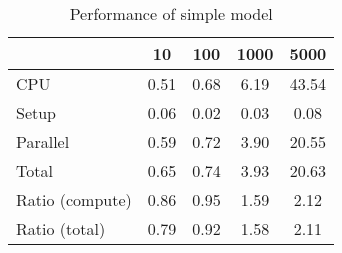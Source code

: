 \begin{table}[!h]
\centering
\caption{Performance of simple model}
\begin{tabular}{l*{4}{c}}\hline
& 10 &             100 &            1000 &            5000 \\ \hline
CPU &     0.51 &      0.68 &      6.19 &     43.54 \\
Setup &     0.06 &      0.02 &      0.03 &      0.08 \\
Parallel &     0.59 &      0.72 &      3.90 &     20.55 \\
Total &     0.65 &      0.74 &      3.93 &     20.63 \\
Ratio (compute) &     0.86 &      0.95 &      1.59 &      2.12 \\
Ratio (total) &     0.79 &      0.92 &      1.58 &      2.11 \\
\hline
\end{tabular}
\end{table}
